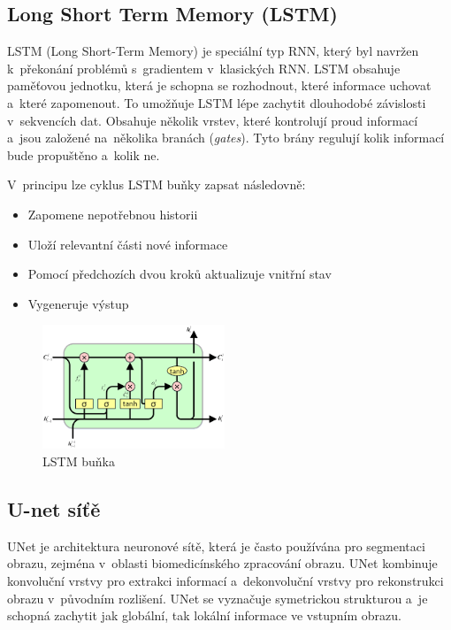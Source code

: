 \subsection{Long Short Term Memory (LSTM)}

LSTM (Long Short-Term Memory) je speciální typ RNN, který byl navržen k~překonání problémů s~gradientem v~klasických RNN. LSTM obsahuje paměťovou jednotku, která je schopna se rozhodnout, které informace uchovat a~které zapomenout. To umožňuje LSTM lépe zachytit dlouhodobé závislosti v~sekvencích dat.
Obsahuje několik vrstev, které kontrolují proud informací a~jsou založené na~několika branách (\emph{gates}).
Tyto brány regulují kolik informací bude propuštěno a~kolik ne.

V~principu lze cyklus LSTM buňky zapsat následovně:
\begin{itemize}
    \item Zapomene nepotřebnou historii
    \item Uloží relevantní části nové informace
    \item Pomocí předchozích dvou kroků aktualizuje vnitřní stav
    \item Vygeneruje výstup
\end{itemize}

\begin{figure}[h]
    \centering
    \includegraphics[height=10em]{images/09_lstm.png}
    \caption{LSTM buňka}
    \label{LSTM}
\end{figure}
\FloatBarrier

\subsection{U-net síťě}

UNet je architektura neuronové sítě, která je často používána pro segmentaci obrazu, zejména v~oblasti biomedicínského zpracování obrazu. UNet kombinuje konvoluční vrstvy pro extrakci informací a~dekonvoluční vrstvy pro rekonstrukci obrazu v~původním rozlišení. UNet se vyznačuje symetrickou strukturou a~je schopná zachytit jak globální, tak lokální informace ve vstupním obrazu.

